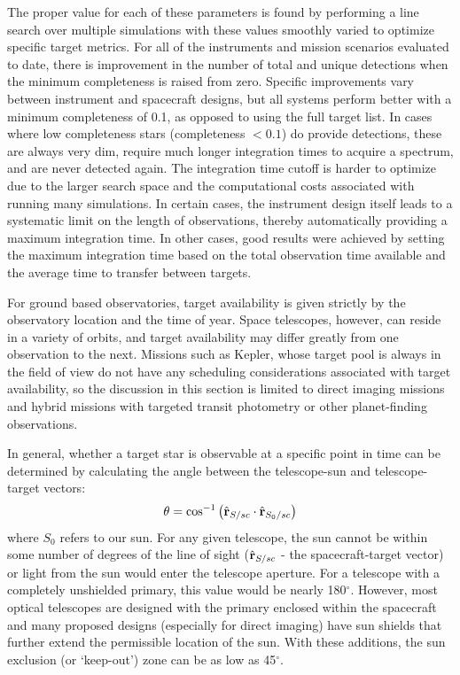 The proper value for each of these parameters is found by performing a line search over multiple simulations with these values smoothly varied to optimize specific target metrics.  For all of the instruments and mission scenarios evaluated to date, there is improvement in the number of total and unique detections when the minimum completeness is raised from zero.  Specific improvements vary between instrument and spacecraft designs, but all systems perform better with a minimum completeness of 0.1, as opposed to using the full target list.  In cases where low completeness stars (completeness  $< 0.1$) do provide detections, these are always very dim, require much longer integration times to acquire a spectrum, and are never detected again.  The integration time cutoff is harder to optimize due to the larger search space and the computational costs associated with running many simulations.  In certain cases, the instrument design itself leads to a systematic limit on the length of observations, thereby automatically providing a maximum integration time.  In other cases, good results were achieved by setting the maximum integration time based on the total observation time available and the average time to transfer between targets.

For ground based observatories, target availability is given strictly by the observatory location and the time of year.  Space telescopes, however, can reside in a variety of orbits, and target availability may differ greatly from one observation to the next.  Missions such as Kepler, whose target pool is always in the field of view do not have any scheduling considerations associated with target availability, so the discussion in this section is limited to direct imaging missions and hybrid missions with targeted transit photometry or other planet-finding observations.

In general, whether a target star is observable at a specific point in time can be determined by calculating the angle between the telescope-sun and telescope-target vectors:
\begin{equation}
\theta = \cos^{-1}\left(\hat{\mathbf r}_{S/sc} \cdot \hat{\mathbf r}_{S_0/sc}\right)
\end{equation}
where $S_0$ refers to our sun.  For any given telescope, the sun cannot be within some number of degrees of the line of sight ($\hat{\mathbf r}_{S/sc}$ - the spacecraft-target vector) or light from the sun would enter the telescope aperture.  For a  telescope with a completely unshielded primary, this value would be nearly 180$^\circ$.  However, most optical telescopes are designed with the primary enclosed within the spacecraft and many proposed designs (especially for direct imaging) have sun shields that further extend the permissible location of the sun.  With these additions, the sun exclusion (or `keep-out') zone can be as low as 45$^\circ$.

